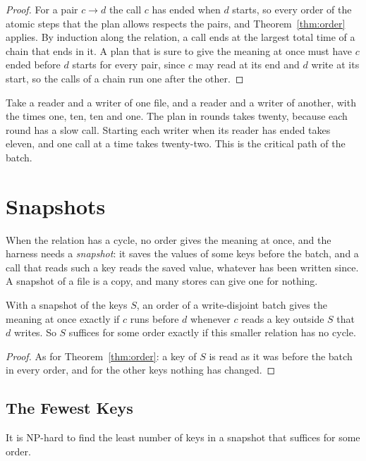 \documentclass[acmsmall,nonacm,screen]{acmart}
\newcommand{\claim}[2]{#2}
\begin{document}
\begin{proof}
For a pair $c \to d$ the call $c$ has ended when $d$ starts, so every order of the atomic
steps that the plan allows respects the pairs, and Theorem~\ref{thm:order} applies. By
induction along the relation, a call ends at the largest total time of a chain that ends in
it. A plan that is sure to give the meaning at once must have $c$ ended before $d$ starts for
every pair, since $c$ may read at its end and $d$ write at its start, so the calls of a
chain run one after the other.
\end{proof}

\claim{time-example}{Take a reader and a writer of one file, and a reader and a writer of
another, with the times one, ten, ten and one. The plan in rounds takes twenty, because each
round has a slow call. Starting each writer when its reader has ended takes eleven, and one
call at a time takes twenty-two.} This is the critical path of the batch.

\section{Snapshots}\label{sec:snapshots}

When the relation has a cycle, no order gives the meaning at once, and the harness needs a
\emph{snapshot}: it saves the values of some keys before the batch, and a call that reads
such a key reads the saved value, whatever has been written since. A snapshot of a file is a
copy, and many stores can give one for nothing.

\begin{theorem}[Snapshots]\label{thm:snapshot}
With a snapshot of the keys $S$, an order of a write-disjoint batch gives the meaning at
once exactly if $c$ runs before $d$ whenever $c$ reads a key outside $S$ that $d$ writes. So
$S$ suffices for some order exactly if this smaller relation has no cycle.
\end{theorem}

\begin{proof}
As for Theorem~\ref{thm:order}: a key of $S$ is read as it was before the batch in every
order, and for the other keys nothing has changed.
\end{proof}

\subsection{The Fewest Keys}

\begin{theorem}[Hardness]\label{thm:hard}
It is NP-hard to find the least number of keys in a snapshot that suffices for some order.
\end{theorem}
\end{document}
